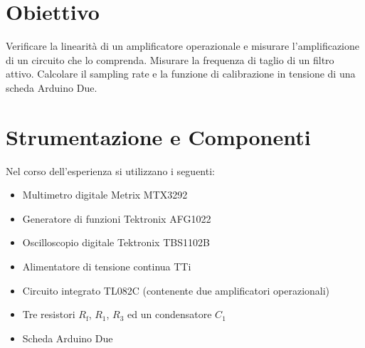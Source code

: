 \documentclass[a4paper,11pt]{article} %
\begin{document}
\section{Obiettivo}
Verificare la linearità di un amplificatore operazionale e misurare l'amplificazione di un circuito che lo comprenda.
Misurare la frequenza di taglio di un filtro attivo. Calcolare il sampling rate e la funzione di calibrazione in
tensione di una scheda Arduino Due.


\section{Strumentazione e Componenti}\label{s:strumenti}
Nel corso dell'esperienza si utilizzano i seguenti:
\begin{itemize}
	\item Multimetro digitale Metrix MTX3292
	\item Generatore di funzioni Tektronix AFG1022
	\item Oscilloscopio digitale Tektronix TBS1102B
	\item Alimentatore di tensione continua TTi
	\item Circuito integrato TL082C (contenente due amplificatori operazionali)
	\item Tre resistori $R_{\text{f}}$, $R_{1}$, $R_{3}$ ed un condensatore $C_{1}$ 
	\item Scheda Arduino Due
\end{itemize}
\end{document}
